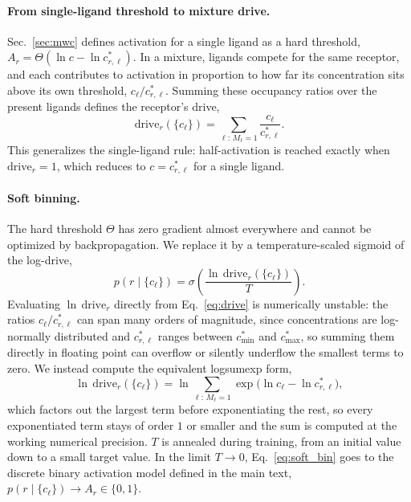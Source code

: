 \documentclass[aps,pre,superscriptaddress,floatfix,longbibliography]{revtex4-2}
\begin{document}
\paragraph{From single-ligand threshold to mixture drive.}
Sec.~\ref{sec:mwc} defines activation for a single ligand as a hard
threshold, $A_r=\Theta(\ln c-\ln c^*_{r,\ell})$. In a mixture, ligands
compete for the same receptor, and each contributes to activation in
proportion to how far its concentration sits above its own threshold,
$c_\ell/c^*_{r,\ell}$. Summing these occupancy ratios over the present
ligands defines the receptor's drive,
\begin{equation}
\text{drive}_r(\{c_\ell\}) = \sum_{\ell:\,M_\ell=1} \frac{c_\ell}{c^*_{r,\ell}}.
\label{eq:drive}
\end{equation}
This generalizes the single-ligand rule: half-activation is reached exactly
when $\text{drive}_r=1$, which reduces to $c=c^*_{r,\ell}$ for a single ligand.

\paragraph{Soft binning.} The hard threshold $\Theta$ has zero gradient
almost everywhere and cannot be optimized by backpropagation. We replace it
by a temperature-scaled sigmoid of the log-drive,
\begin{equation}
p(r\mid\{c_\ell\}) = \sigma\!\left(\frac{\ln\,\text{drive}_r(\{c_\ell\})}{T}\right).
\label{eq:soft_bin}
\end{equation}
Evaluating $\ln\,\text{drive}_r$ directly from Eq.~\eqref{eq:drive} is
numerically unstable: the ratios $c_\ell/c^*_{r,\ell}$ can span many
orders of magnitude, since concentrations are log-normally distributed and
$c^*_{r,\ell}$ ranges between $c^*_\text{min}$ and $c^*_\text{max}$, so summing
them directly in floating point can overflow or silently underflow the
smallest terms to zero. We instead compute the equivalent logsumexp form,
\begin{equation}
\ln\,\text{drive}_r(\{c_\ell\}) = \ln\sum_{\ell:\,M_\ell=1} \exp\bigl(\ln c_\ell - \ln c^*_{r,\ell}\bigr),
\label{eq:logsumexp}
\end{equation}
which factors out the largest term before exponentiating the rest, so every
exponentiated term stays of order $1$ or smaller and the sum is computed at
the working numerical precision. $T$ is annealed during training, from an
initial value down to a small target value. In the limit $T\to0$,
Eq.~\eqref{eq:soft_bin} goes to the discrete binary activation model defined
in the main text, $p(r\mid\{c_\ell\})\to A_r\in\{0,1\}$.
\end{document}
